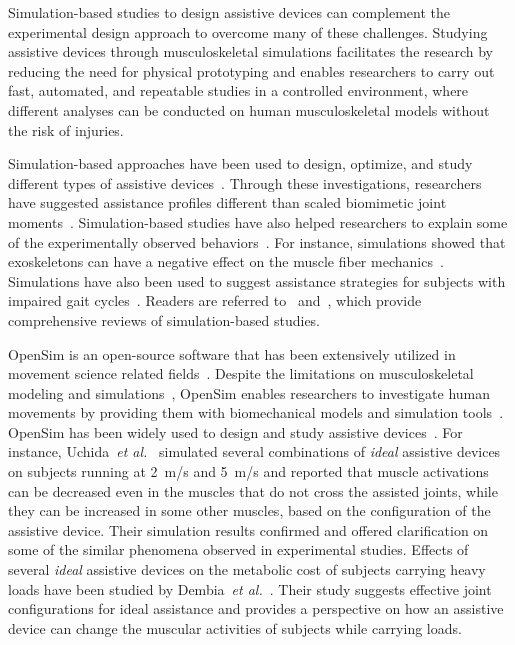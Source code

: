 \documentclass[10pt,letterpaper]{article}
\newcommand{\etal}{\textit{et al.}}
\begin{document}
Simulation-based studies to design assistive devices can complement the experimental design approach  to overcome many of these challenges. Studying assistive devices through musculoskeletal simulations facilitates the research by reducing the need for physical prototyping and enables researchers to carry out fast, automated, and repeatable studies in a controlled environment, where different analyses can be conducted on human musculoskeletal models without the risk of injuries.

Simulation-based approaches have been used to design, optimize, and study different types of assistive devices~\cite{Grabke2019,Smith2021review}. Through these investigations, researchers have suggested assistance profiles different than scaled biomimetic joint moments~\cite{Dembia2017,Uchida2016_idealexo_running}. Simulation-based studies have also helped researchers to explain some of the experimentally observed behaviors~\cite{Jackson2017,Farris2014}. For instance, simulations showed that exoskeletons can have a negative effect on the muscle fiber mechanics~\cite{Farris2014,Sawicki2016}. Simulations have also been used to suggest assistance strategies for subjects with impaired gait cycles~\cite{Lim2016,Lim2017}. Readers are referred to~\cite{Grabke2019} and~\cite{Smith2021review}, which provide comprehensive reviews of simulation-based studies.

OpenSim is an open-source software that has been extensively utilized in movement science related fields~\cite{Seth2018,Delp2007}. Despite the limitations on musculoskeletal modeling and simulations~\cite{Hicks2015}, OpenSim enables researchers  to investigate human movements by providing them with biomechanical models and simulation tools~\cite{Seth2018,Dembia2017}. OpenSim has been widely used to design and study assistive devices~\cite{Uchida2016_idealexo_running,Dembia2017,Gordon2018,Ong2016,Aftabi2021simulation,Bianco2021}. For instance, Uchida~\etal~\cite{Uchida2016_idealexo_running} simulated several combinations of \emph{ideal} assistive devices on subjects running at 2~m/s and 5~m/s and reported that muscle activations can be decreased even in the muscles that do not cross the assisted joints, while they can be increased in some other muscles, based on the configuration of the assistive device. Their simulation results confirmed and offered clarification on some of the similar phenomena observed in experimental studies. Effects of several \emph{ideal} assistive devices on the metabolic cost of subjects carrying heavy loads have been studied by Dembia~\etal~\cite{Dembia2017}. Their study suggests effective joint configurations for ideal assistance and provides a perspective on how an assistive device can change the muscular activities of subjects while carrying loads.
\end{document}
